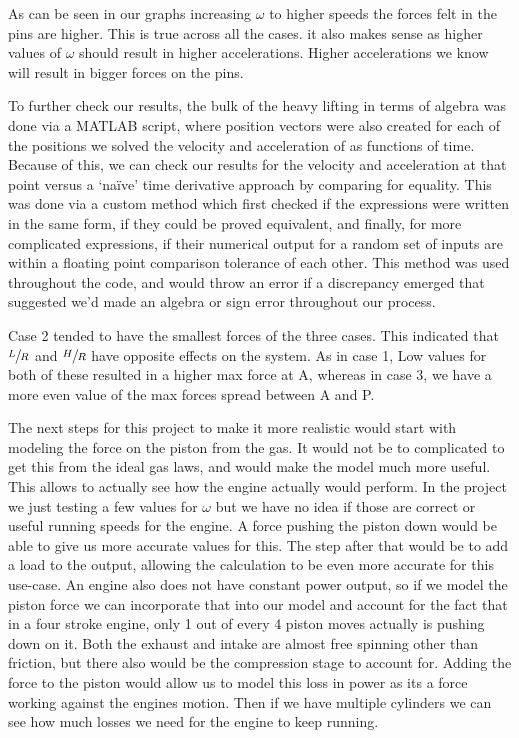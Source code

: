 \documentclass[nofoot,pdf-a,balance,colorlinks,upint,subscriptcorrection,varvw,mathalfa=cal=boondoxo]{asmeconf}
\begin{document}
	As can be seen in our graphs increasing $\omega$ to higher speeds the forces felt in the pins are higher. This is true across all the cases. it also makes sense as higher values of $\omega$ should result in higher accelerations. Higher accelerations we know will result in bigger forces on the pins.
    
    To further check our results, the bulk of the heavy lifting in terms of algebra was done via a MATLAB script, where position vectors were also created for each of the positions we solved the velocity and acceleration of as functions of time. Because of this, we can check our results for the velocity and acceleration at that point versus a `naïve' time derivative approach by comparing for equality. This was done via a custom method which first checked if the expressions were written in the same form, if they could be proved equivalent, and finally, for more complicated expressions, if their numerical output for a random set of inputs are within a floating point comparison tolerance of each other. This method was used throughout the code, and would throw an error if a discrepancy emerged that suggested we'd made an algebra or sign error throughout our process.


	Case 2 tended to have the smallest forces of the three cases. This indicated that $\sfrac{L}{R}$ and $\sfrac{H}{R}$ have opposite effects on the system. As in case 1, Low values for both of these resulted in a higher max force at A, whereas in case 3, we have a more even value of the max forces spread between A and P.

	The next steps for this project to make it more realistic would start with modeling the force on the piston from the gas. It would not be to complicated to get this from the ideal gas laws, and would make the model much more useful. This allows to actually see how the engine actually would perform. In the project we just testing a few values for $\omega$ but we have no idea if those are correct or useful running speeds for the engine. A force pushing the piston down would be able to give us more accurate values for this. The step after that would be to add a load to the output, allowing the calculation to be even more accurate for this use-case. An engine also does not have constant power output, so if we model the piston force we can incorporate that into our model and account for the fact that in a four stroke engine, only 1 out of every 4 piston moves actually is pushing down on it. Both the exhaust and intake are almost free spinning other than friction, but there also would be the compression stage to account for. Adding the force to the piston would allow us to model this loss in power as its a force working against the engines motion. Then if we have multiple cylinders we can see how much losses we need for the engine to keep running. 
\end{document}
